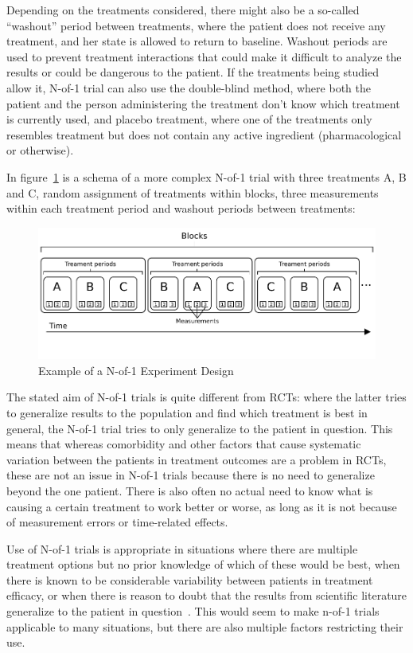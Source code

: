 \documentclass[12pt,a4paper,leqno]{report}
\theoremstyle{plain}
\theoremstyle{definition}
\theoremstyle{remark}
\begin{document}
Depending on the treatments considered, there might also be a so-called
``washout'' period between treatments, where the patient does not receive any
treatment, and her state is allowed to return to baseline. Washout periods are used to
prevent treatment interactions that could make it difficult to analyze the
results or could be dangerous to the patient. If the treatments being studied
allow it, N-of-1 trial can also use the double-blind method, where both the patient
and the person administering the treatment don't know which treatment is currently used, and placebo
treatment, where one of the treatments only resembles treatment but does not
contain any active ingredient (pharmacological or otherwise).

In figure\ \ref{examplenof1schema} is a schema of a more complex N-of-1 trial with three treatments A, B and C,
random assignment of treatments within blocks, three measurements within each
treatment period and washout periods between treatments:

\begin{figure}[H]
    \centering
    \caption{Example of a N-of-1 Experiment Design}\label{examplenof1schema}
    \includegraphics{n-of-1_schema.pdf}
\end{figure}

The stated aim of N-of-1 trials is quite different from RCTs: where the latter
tries to generalize results to the population and find which treatment is best in
general, the N-of-1 trial tries to only generalize to the patient in question.
This means that whereas comorbidity and other factors that cause systematic
variation between the patients in treatment outcomes are a problem in RCTs,
these are not an issue in N-of-1 trials because there is no need to generalize
beyond the one patient. There is also often no actual need to know what is
causing a certain treatment to work better or worse, as long as it is not
because of measurement errors or time-related effects.

Use of N-of-1 trials is appropriate in situations where there are multiple
treatment options but no prior knowledge of which of these would be
best, when there is known to be considerable variability between patients in
treatment efficacy, or when there is reason to doubt that the results from
scientific literature generalize to the patient in question\ \cite{nofone}. This
would seem to make n-of-1 trials applicable to many situations, but there are
also multiple factors restricting their use.
\end{document}
